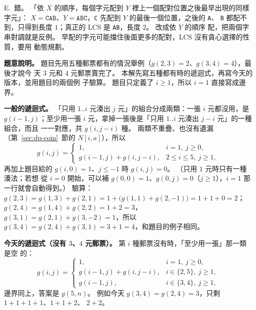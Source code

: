 E.\ 錯。 「依 $X$ 的順序，每個字元配到 $Y$ 裡上一個配對位置之後最早出現的同樣字元」：
$X = \texttt{CAB}$、$Y = \texttt{ABC}$，\texttt{C} 先配到 $Y$ 的最後一個位置，之後的 \texttt{A}、
\texttt{B} 都配不到，只得到長度 $1$；真正的 LCS 是 \texttt{AB}，長度 $2$。 改成依 $Y$ 的順序
配，把兩個字串對調就是反例。 早配的字元可能擋住後面更多的配對，LCS 沒有貪心選擇的性質，要用
動態規劃。

\textbf{題意說明。} 題目先用五種郵票都有的情況舉例（$g(2,3) = 2$、$g(3,4) = 4$），最後才說今
天 $3$ 元和 $4$ 元郵票賣完了。 本解先寫五種都有時的遞迴式，再寫今天的版本，並用題目的兩個例
子驗算。 題目只定義了 $i \ge 1$，所以 $i = 1$ 直接寫成邊界。

\textbf{一般的遞迴式。} 「只用 $1..i$ 元湊出 $j$ 元」的組合分成兩類：一張 $i$ 元都沒用，是
$g(i - 1, j)$；至少用一張 $i$ 元，拿掉一張後是「只用 $1..i$ 元湊出 $j - i$ 元」的一種組合，而且
一一對應，共 $g(i, j - i)$ 種。 兩類不重疊、也沒有遺漏（第~\ref{sec:dp-coin}~節的
$N[i, a]$），所以
\[
g(i, j) = \begin{cases}
1, & i = 1,\ j \ge 0, \\
g(i - 1, j) + g(i, j - i), & 2 \le i \le 5,\ j \ge 1,
\end{cases}
\]
再加上題目給的 $g(i, 0) = 1$、$j \le -1$ 時 $g(i, j) = 0$。 （只用 $1$ 元時只有一種湊法；若想
從 $i = 0$ 開始，可以補 $g(0, 0) = 1$、$g(0, j) = 0$（$j \ge 1$），$i = 1$ 那一行就會自動得到。）
驗算：$g(2, 3) = g(1, 3) + g(2, 1) = 1 + \bigl(g(1, 1) + g(2, -1)\bigr) = 1 + 1 + 0 = 2$；
$g(2, 4) = g(1, 4) + g(2, 2) = 1 + 2 = 3$，$g(3, 1) = g(2, 1) + g(3, -2) = 1$，所以
$g(3, 4) = g(2, 4) + g(3, 1) = 3 + 1 = 4$，和題目的例子相同。

\textbf{今天的遞迴式（沒有 $3$、$4$ 元郵票）。} 第 $i$ 種郵票沒有時，「至少用一張」那一類是空
的：
\[
g(i, j) = \begin{cases}
1, & i = 1,\ j \ge 0, \\
g(i - 1, j) + g(i, j - i), & i \in \{2, 5\},\ j \ge 1, \\
g(i - 1, j), & i \in \{3, 4\},\ j \ge 1,
\end{cases}
\]
邊界同上，答案是 $g(5, n)$。 例如今天 $g(3, 4) = g(2, 4) = 3$，只剩 $1 + 1 + 1 + 1$、$1 + 1 + 2$、
$2 + 2$。

